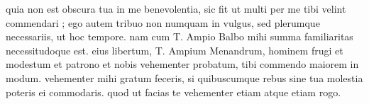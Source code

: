 


quia non est obscura tua in me benevolentia, sic fit ut multi per me tibi velint commendari ; ego autem tribuo non numquam in vulgus, sed plerumque necessariis, ut hoc
tempore. nam cum T. Ampio Balbo mihi summa familiaritas necessitudoque est. eius libertum, T. Ampium Menandrum, hominem frugi et modestum et patrono et nobis vehementer probatum, tibi commendo maiorem in modum. vehementer mihi gratum feceris, si quibuscumque rebus
sine tua molestia poteris ei commodaris. quod ut facias te vehementer etiam atque etiam rogo.
